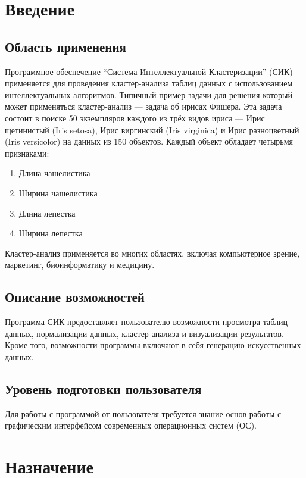 \documentclass[12pt]{instruction}
\begin{document}
\tableofcontents 

\newpage
\section{Введение}
\subsection{Область применения} 

Программное обеспечение ``Система Интеллектуальной Кластеризации'' (СИК) применяется для проведения кластер-анализа таблиц данных с использованием интеллектуальных алгоритмов. Типичный пример задачи для решения который может применяться кластер-анализ --- задача об ирисах Фишера. Эта задача состоит в поиске 50 экземпляров каждого из трёх видов ириса --- Ирис щетинистый (Iris setosa), Ирис виргинский (Iris virginica) и Ирис разноцветный (Iris versicolor) на данных из 150 объектов. Каждый объект обладает четырьмя признаками: 
\begin{enumerate}
	\item Длина чашелистика
	\item Ширина чашелистика
	\item Длина лепестка
	\item Ширина лепестка
\end{enumerate}
Кластер-анализ применяется во многих областях, включая компьютерное зрение, маркетинг, биоинформатику и медицину\cite{amorim}.


\subsection{Описание возможностей} 
Программа СИК предоставляет пользователю возможности просмотра таблиц данных, нормализации данных, кластер-анализа и визуализации результатов. Кроме того, возможности программы включают в себя генерацию искусственных данных. 

\subsection{Уровень подготовки пользователя}
Для работы с программой от пользователя требуется знание основ работы с графическим интерфейсом современных операционных систем (ОС).

\section{Назначение}
\end{document}
